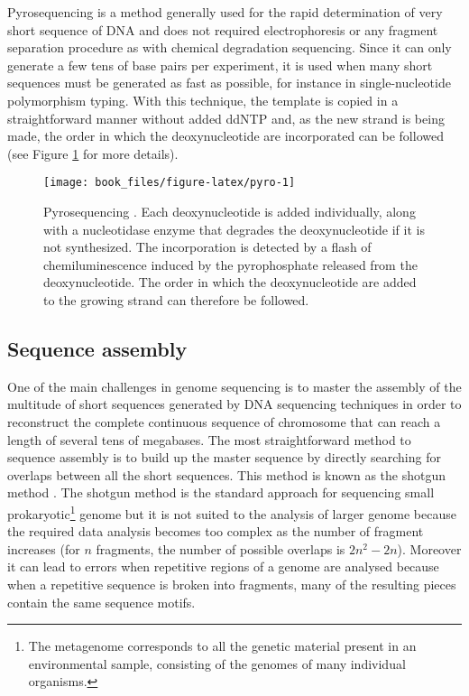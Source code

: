 \documentclass[]{book}
\let\rmarkdownfootnote\footnote%
\def\footnote{\protect\rmarkdownfootnote}
\begin{document}
Pyrosequencing is a method generally used for the rapid determination of
very short sequence of DNA and does not required electrophoresis or any
fragment separation procedure as with chemical degradation sequencing.
Since it can only generate a few tens of base pairs per experiment, it
is used when many short sequences must be generated as fast as possible,
for instance in single-nucleotide polymorphism typing. With this
technique, the template is copied in a straightforward manner without
added ddNTP and, as the new strand is being made, the order in which the
deoxynucleotide are incorporated can be followed (see Figure
\ref{fig:pyro} for more details).



\begin{figure}

{\centering \texttt{[image: book\_files/figure-latex/pyro-1]} 

}

\caption{Pyrosequencing \citep{brown2007genomes}. Each deoxynucleotide is added individually, along with a nucleotidase enzyme that degrades the deoxynucleotide if it is not synthesized. The incorporation is detected by a flash of chemiluminescence induced by the pyrophosphate released from the deoxynucleotide. The order in which the deoxynucleotide are added to the growing strand can therefore be followed.}\label{fig:pyro}
\end{figure}

\hypertarget{sequence-assembly}{%
\subsection{Sequence assembly}\label{sequence-assembly}}

One of the main challenges in genome sequencing is to master the
assembly of the multitude of short sequences generated by DNA sequencing
techniques in order to reconstruct the complete continuous sequence of
chromosome that can reach a length of several tens of megabases. The
most straightforward method to sequence assembly is to build up the
master sequence by directly searching for overlaps between all the short
sequences. This method is known as the shotgun method
\citep{anderson1981shotgun}. The shotgun method is the standard approach for
sequencing small prokaryotic\footnote{The metagenome corresponds to all the genetic material present in
  an environmental sample, consisting of the genomes of many
  individual organisms.} genome but it is not suited to the
analysis of larger genome because the required data analysis becomes too
complex as the number of fragment increases (for \(n\) fragments, the
number of possible overlaps is \(2n^2 - 2n\)). Moreover it can lead to
errors when repetitive regions of a genome are analysed because when a
repetitive sequence is broken into fragments, many of the resulting
pieces contain the same sequence motifs.
\end{document}
